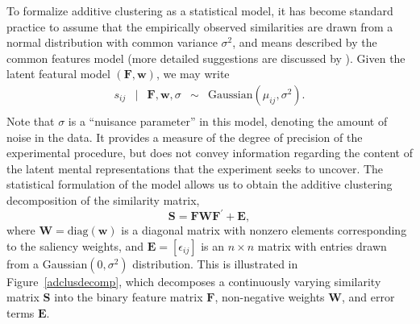 \documentclass[11pt]{article}
\newcommand{\condon}{|}
\newcommand{\efc}{\vspace*{15pt}}
\newcommand{\capspace}{}
\begin{document}
To formalize additive clustering as a statistical model, it has become standard practice \cite{tenenbaum96,lee02b} to assume that the empirically observed similarities are drawn from a normal distribution with common variance $\sigma^2$, and means described by the common features model (more detailed suggestions are discussed by ). Given the latent featural model $(\mathbf{F},\mathbf{w})$, we may write
  \begin{equation}
   \begin{array}{rclcl}
   s_{ij} &\condon & \mathbf{F},\mathbf{w},\sigma &\sim &\mbox{Gaussian}(\mu_{ij},\sigma^2). \\
   \end{array}
   \label{likelihoodmodel}
   \end{equation}
Note that $\sigma$ is a ``nuisance parameter'' in this model, denoting the amount of noise in the data. It provides a measure of the degree of precision of the experimental procedure, but does not convey information regarding the content of the latent mental representations that the experiment seeks to uncover. The statistical formulation of the model allows us to obtain the additive clustering decomposition of the similarity matrix,
   \begin{equation}
   \mathbf{S} = \mathbf{F}\mathbf{W}\mathbf{F}^\prime + \mathbf{E}, \label{adclus}
   \end{equation}
where $\mathbf{W}=\mbox{diag}(\mathbf{w})$ is a diagonal matrix with nonzero elements corresponding to the saliency weights, and $\mathbf{E}=[\epsilon_{ij}]$ is an $n \times n$ matrix with entries drawn from a Gaussian$(0,\sigma^2)$ distribution. This is illustrated in Figure~\ref{adclusdecomp}, which decomposes a continuously varying similarity matrix $\mathbf{S}$ into the binary feature matrix $\mathbf{F}$, non-negative weights $\mathbf{W}$, and error terms $\mathbf{E}$.

\begin{figure*}
\begin{center}
\caption{\capspace The additive clustering decomposition of a similarity matrix. A continuously varying similarity matrix $\mathbf{S}$ may be decomposed into a binary feature matrix $\mathbf{F}$, a diagonal matrix of non-negative weights $\mathbf{W}$, and a matrix of error terms $\mathbf{E}$.\efc}
\label{adclusdecomp}
\end{center}
\end{figure*}
\end{document}
